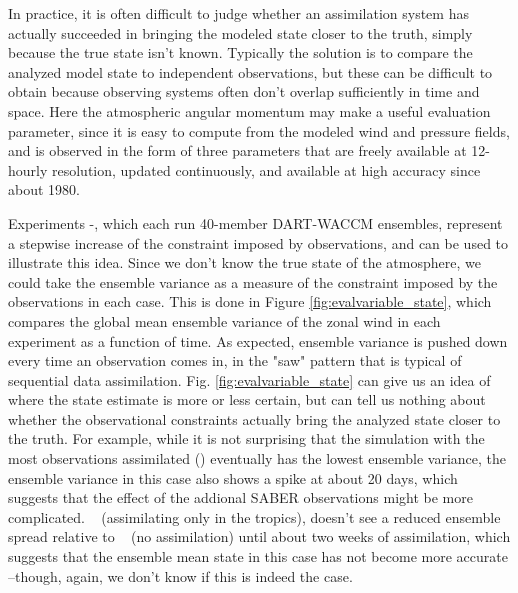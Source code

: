 In practice, it is often difficult to judge whether an assimilation system has actually succeeded in bringing the modeled state closer to the truth, simply because the true state isn't known. 
Typically the solution is to compare the analyzed model state to independent observations, but these can be difficult to obtain because observing systems often don't overlap sufficiently in time and space.
Here the atmospheric angular momentum may make a useful evaluation parameter, since it is easy to compute from the modeled wind and pressure fields, and is observed in the form of three parameters that are freely available at 12-hourly resolution, updated continuously, and available at high accuracy since about 1980.  

Experiments \WACCMNODA-\NCARFULL, which each run 40-member DART-WACCM ensembles, 
represent a stepwise increase of the constraint imposed by observations, and can be used to illustrate this idea.
Since we don't know the true state of the atmosphere, we could take the ensemble variance as a measure of the constraint imposed by the observations in each case. 
This is done in Figure \ref{fig:evalvariable_state}, which compares 
the global mean ensemble variance of the zonal wind in each experiment as a function of time.  
As expected, ensemble variance is pushed down every time an observation comes in, in the "saw" pattern that is typical of sequential data assimilation. 
Fig.  \ref{fig:evalvariable_state} can give us an idea of where the state estimate is more or less certain, but can tell us nothing about whether the observational constraints actually bring the analyzed state closer to the truth. 
For example, while it is not surprising that the simulation with the most observations assimilated (\NCARFULL) eventually has the lowest ensemble variance, the ensemble variance in this case also shows a spike at about 20 days, which suggests that the effect of the addional SABER observations might be more complicated. 
\WACCMTROPICS~ (assimilating only in the tropics), doesn't see a reduced ensemble spread relative to \NODA~ (no assimilation) until about two weeks of assimilation, which suggests that the ensemble mean state in this case has not become more accurate --though, again, we don't know if this is indeed the case.  


